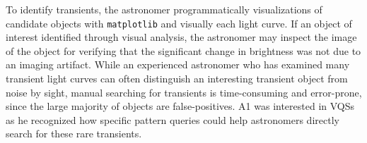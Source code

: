  \par\noindent{} 
 \npar {} To identify transients, the astronomer programmatically  visualizations of candidate objects with \texttt{matplotlib} and visually  each light curve.  If an object of interest  identified through visual analysis, the astronomer may inspect the image of the object for verifying that the significant change in brightness was not due to an imaging artifact. While an experienced astronomer who has examined many transient light curves can often distinguish an interesting transient object from noise by sight, manual searching for transients is time-consuming and error-prone, since the large majority of objects are false-positives. A1 was interested in VQSs as he recognized how specific pattern  queries could help astronomers directly search for these rare transients.
